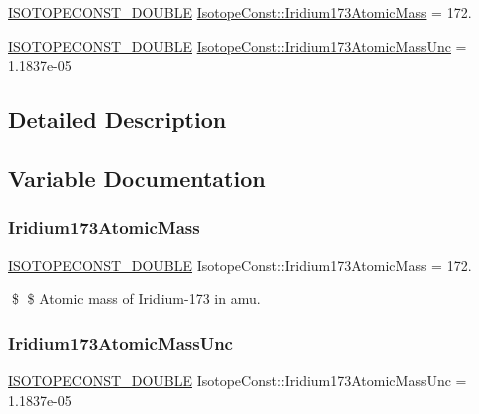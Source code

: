\begin{DoxyCompactItemize}
\item 
\mbox{\hyperlink{group___isotope_const-_macros_ga8f45a7272ce02c0b4c65c44636ed719a}{I\+S\+O\+T\+O\+P\+E\+C\+O\+N\+S\+T\+\_\+\+D\+O\+U\+B\+LE}} \mbox{\hyperlink{group___isotope_const-_iridium-_ir173_ga589d8bc74fdcf3e6cff71bdd8c5dacbc}{Isotope\+Const\+::\+Iridium173\+Atomic\+Mass}} = 172.
\item 
\mbox{\hyperlink{group___isotope_const-_macros_ga8f45a7272ce02c0b4c65c44636ed719a}{I\+S\+O\+T\+O\+P\+E\+C\+O\+N\+S\+T\+\_\+\+D\+O\+U\+B\+LE}} \mbox{\hyperlink{group___isotope_const-_iridium-_ir173_ga8920372977dd5908f4a8cef89cb5f249}{Isotope\+Const\+::\+Iridium173\+Atomic\+Mass\+Unc}} = 1.\+1837e-\/05
\end{DoxyCompactItemize}


\subsection{Detailed Description}


\subsection{Variable Documentation}
\mbox{\label{group___isotope_const-_iridium-_ir173_ga589d8bc74fdcf3e6cff71bdd8c5dacbc}} 
\subsubsection{\texorpdfstring{Iridium173\+Atomic\+Mass}{Iridium173AtomicMass}}
{\footnotesize\ttfamily \mbox{\hyperlink{group___isotope_const-_macros_ga8f45a7272ce02c0b4c65c44636ed719a}{I\+S\+O\+T\+O\+P\+E\+C\+O\+N\+S\+T\+\_\+\+D\+O\+U\+B\+LE}} Isotope\+Const\+::\+Iridium173\+Atomic\+Mass = 172.}

\$ \$ Atomic mass of Iridium-\/173 in amu. \mbox{\label{group___isotope_const-_iridium-_ir173_ga8920372977dd5908f4a8cef89cb5f249}} 
\subsubsection{\texorpdfstring{Iridium173\+Atomic\+Mass\+Unc}{Iridium173AtomicMassUnc}}
{\footnotesize\ttfamily \mbox{\hyperlink{group___isotope_const-_macros_ga8f45a7272ce02c0b4c65c44636ed719a}{I\+S\+O\+T\+O\+P\+E\+C\+O\+N\+S\+T\+\_\+\+D\+O\+U\+B\+LE}} Isotope\+Const\+::\+Iridium173\+Atomic\+Mass\+Unc = 1.\+1837e-\/05}

